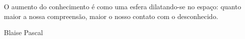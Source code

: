\begin{dedica}  %

O aumento do conhecimento é como uma esfera dilatando-se no espaço: quanto maior a nossa compreensão, maior o nosso contato com o desconhecido.

\vspace{5mm}

Blaise Pascal

\end{dedica}

